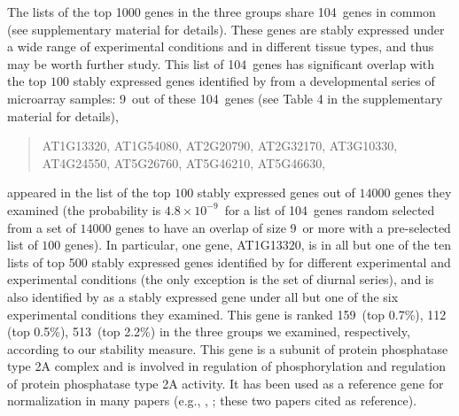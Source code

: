 \documentclass[letterpaper,12pt]{article}
\newcommand{\overlapGene}{104~}
\newcommand{\overlapGeneCze}{9~}
\newcommand{\overlapProb}{$4.8\times 10^{-9}$~}
\newcommand{\rankInSeedling}{159~}
\newcommand{\rankInLeaf}{112~}
\newcommand{\rankInTissue}{513~}
\newcommand{\rankTopPctSeedling}{0.7\%}
\newcommand{\rankTopPctLeaf}{0.5\%}
\newcommand{\rankTopPctTissue}{2.2\%}
\begin{document}
The lists of the top 1000 genes in the three groups share \overlapGene genes in common (see supplementary material for details).  These
genes are stably expressed under a wide range of experimental conditions and
in different tissue types, and thus may be worth further study. This list of
\overlapGene genes has significant overlap with the top $100$ stably expressed genes
identified by \cite{czechowski2005genome} from a developmental series of
microarray samples: \overlapGeneCze out of these \overlapGene genes (see Table 4 in the
supplementary material for details),
\begin{center}
\begin{quote}
AT1G13320, AT1G54080, AT2G20790, AT2G32170, AT3G10330,\\
 AT4G24550, AT5G26760, AT5G46210, AT5G46630, \\
\end{quote}
\end{center}
appeared in the list of the top $100$ stably expressed genes
out of $14000$ genes they examined (the probability is \overlapProb for
a list of \overlapGene genes random selected from a set of $14000$ genes to have an
overlap of size \overlapGeneCze or more with a pre-selected list of $100$ genes). In
particular, one gene, AT1G13320, is in all but one of the ten lists of top 500 stably
expressed genes identified by \cite{czechowski2005genome} for different
experimental and experimental conditions (the only exception is the set of
diurnal series), and is also identified by
\cite{hong2010identification} as a stably expressed gene under all but one of the six
experimental conditions they examined.  This gene is ranked \rankInSeedling (top \rankTopPctSeedling), \rankInLeaf
(top \rankTopPctLeaf), \rankInTissue (top \rankTopPctTissue) in the three
groups we examined, respectively, according to our stability measure.
This gene is a subunit of protein phosphatase type 2A complex and is involved in
regulation of phosphorylation and regulation of protein phosphatase type 2A
activity. It has been used as a reference gene for normalization in many
papers (e.g., \cite{bournier2013arabidopsis}, \cite{baron2012transcriptional};
these two papers cited \cite{czechowski2005genome} as reference). 
\end{document}
